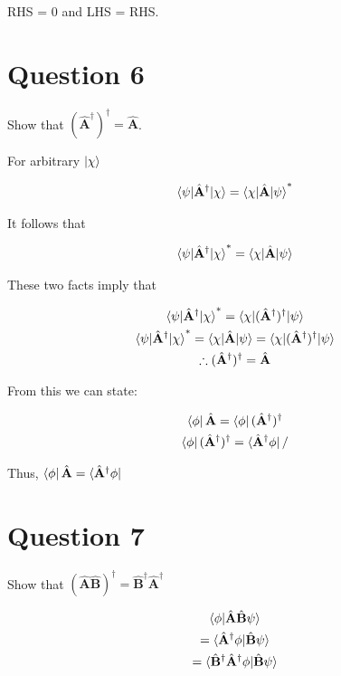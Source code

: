 \documentclass{article}
\let\oldhat\hat
\renewcommand{\hat}[1]{\oldhat{\mathbf{#1}}}
\begin{document}
    RHS = 0 and LHS = RHS.

    


\section{Question 6}

Show that $(\hat{A}^{\dagger})^{\dagger} = \hat{A}$.

For arbitrary $\ket{\chi}$

\begin{gather}
    \braket{\psi|\hat{A}^\dagger|\chi} = \braket{\chi|\hat{A}|\psi}^*
\end{gather}

It follows that

\begin{gather}
    \braket{\psi|\hat{A}^\dagger|\chi}^* = \braket{\chi|\hat{A}|\psi}
\end{gather}

These two facts imply that

\begin{gather}
    \braket{\psi|\hat{A}^\dagger|\chi}^* = \braket{\chi|(\hat{A}^\dagger)^\dagger|\psi}\\
    \braket{\psi|\hat{A}^\dagger|\chi}^* = \braket{\chi|\hat{A}|\psi} = \braket{\chi|(\hat{A}^\dagger)^\dagger|\psi}\\
    \therefore (\hat{A}^{\dagger})^{\dagger} = \hat{A}
\end{gather}

\vspace{2cm}

From this we can state:


\begin{gather}
    \bra{\phi}\hat{A} = \bra{\phi}(\hat{A}^{\dagger})^{\dagger}\\
    \bra{\phi}(\hat{A}^{\dagger})^{\dagger} = \bra{\hat{A}^{\dagger}\phi}/
\end{gather}
\begin{center}
    Thus, $\bra{\phi}\hat{A} = \bra{\hat{A}^{\dagger}\phi}$
\end{center}




\section{Question 7}

    Show that $(\hat{A}\hat{B})^\dagger = \hat{B}^\dagger \hat{A}^\dagger$

    \begin{gather}
        \braket{\phi | \hat{A}\hat{B}\psi}\\
        = \braket{\hat{A}^\dagger \phi | \hat{B}\psi}\\
        = \braket{\hat{B}^\dagger\hat{A}^\dagger \phi | \hat{B}\psi}
    \end{gather}
\end{document}
